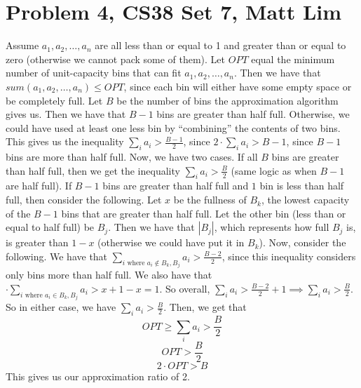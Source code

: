 \documentclass{article}
\begin{document}
\section*{Problem 4, CS38 Set 7, Matt Lim}
Assume $a_1, a_2, \dots, a_n$ are all less than or equal to 1 and greater than
or equal to zero (otherwise we cannot pack some of them).
Let $OPT$ equal the minimum number of unit-capacity bins that can fit $a_1, a_2, \dots, a_n$.
Then we have that $sum(a_1, a_2, \dots, a_n) \leq OPT$, since each bin will
either have some empty space or be completely full.
Let $B$ be the number of bins the approximation algorithm
gives us. Then we have that $B-1$ bins are greater than half full. Otherwise, we
could have used at least one less bin by ``combining'' the contents of two bins.
This gives us the inequality $\sum_i a_i > \frac{B-1}{2}$, since $2 \cdot \sum_i a_i
> B - 1$, since $B-1$ bins are more than half full. Now, we have two cases. If
all $B$ bins are greater than half full, then we get the inequality
$\sum_i a_i > \frac{B}{2}$ (same logic as when $B-1$ are half full).
If $B-1$ bins are greater than half full
and $1$ bin is less than half full, then consider the following. Let $x$ be the
fullness of $B_k$, the lowest capacity of the $B-1$ bins that are greater than half full.
Let the other bin (less than or equal to half full) be $B_j$. Then we have
that $|B_j|$, which represents how full $B_j$ is, is
greater than $1-x$ (otherwise we could have put it in $B_k$). Now, consider the following.
We have that $\sum_{i \text{ where $a_i \notin B_k,B_j$}} a_i > \frac{B-2}{2}$,
since this inequality considers only bins more than half full. We also have that
$\cdot \sum_{i \text{ where $a_i \in B_k, B_j$}} a_i > x + 1 - x = 1$. So overall,
$\sum_{i} a_i > \frac{B-2}{2} + 1
\implies \sum_{i} a_i > \frac{B}{2}$. So in either case, we have $\sum_{i} a_i >
\frac{B}{2}$. Then, we get that
\[ OPT \geq \sum_i a_i > \frac{B}{2} \]
\[ OPT > \frac{B}{2} \]
\[ 2 \cdot OPT > B \]
This gives us our approximation ratio of 2.
\newpage

\end{document}
